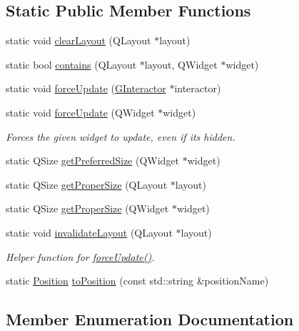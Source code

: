 \subsection*{Static Public Member Functions}
\begin{DoxyCompactItemize}
\item 
static void \mbox{\hyperlink{classGLayout_a2a4db6b65fb8985d7fe716ee01eccdcd}{clear\+Layout}} (Q\+Layout $\ast$layout)
\item 
static bool \mbox{\hyperlink{classGLayout_a7f91a856161d4b245af2abe2911a45cf}{contains}} (Q\+Layout $\ast$layout, Q\+Widget $\ast$widget)
\item 
static void \mbox{\hyperlink{classGLayout_ad3339ee5cb4459fdea04e7e9acf0529b}{force\+Update}} (\mbox{\hyperlink{classGInteractor}{G\+Interactor}} $\ast$interactor)
\item 
static void \mbox{\hyperlink{classGLayout_ade8435fd17db53c0ece27e5997c400d6}{force\+Update}} (Q\+Widget $\ast$widget)
\begin{DoxyCompactList}\small\item\em Forces the given widget to update, even if it\textquotesingle{}s hidden. \end{DoxyCompactList}\item 
static Q\+Size \mbox{\hyperlink{classGLayout_abed90e2fba621607c8e0bc64a63c055a}{get\+Preferred\+Size}} (Q\+Widget $\ast$widget)
\item 
static Q\+Size \mbox{\hyperlink{classGLayout_ab02e7752b1782d032d9ded3c1105e647}{get\+Proper\+Size}} (Q\+Layout $\ast$layout)
\item 
static Q\+Size \mbox{\hyperlink{classGLayout_a3efefdab7a54c7818d0a1241726f5621}{get\+Proper\+Size}} (Q\+Widget $\ast$widget)
\item 
static void \mbox{\hyperlink{classGLayout_afef413b6041460bf82cfee192eb6f6da}{invalidate\+Layout}} (Q\+Layout $\ast$layout)
\begin{DoxyCompactList}\small\item\em Helper function for \mbox{\hyperlink{classGLayout_ad3339ee5cb4459fdea04e7e9acf0529b}{force\+Update()}}. \end{DoxyCompactList}\item 
static \mbox{\hyperlink{classGLayout_ab91b34ae619fcdfcba4522b4f335bf83}{Position}} \mbox{\hyperlink{classGLayout_ab936632074d7d2a4587747ae4f5665cf}{to\+Position}} (const std\+::string \&position\+Name)
\end{DoxyCompactItemize}


\subsection{Member Enumeration Documentation}
\mbox{\label{classGLayout_ab91b34ae619fcdfcba4522b4f335bf83}} 
